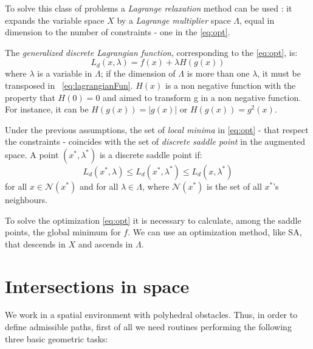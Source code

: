 \documentclass[dissertation.tex]{subfiles}
\begin{document}
To solve this class
of problems a \emph{Lagrange relaxation} method can be used
\cite{bertsekas}: it expands
the variable space $X$ by a \emph{Lagrange multiplier} space
$\Lambda$, equal in dimension to the number of constraints - one in the
\cref{eq:opt}.

The \emph{generalized discrete Lagrangian
  function}, corresponding to the \cref{eq:opt}, is:
\begin{equation}\label{eq:lagrangianFun}
  L_d(x,\lambda)=f(x)+\lambda H(g(x))
\end{equation}
where $\lambda$ is a variable in $\Lambda$; if the dimension of
$\Lambda$ is more than one $\lambda$, it must be transposed in
~\cref{eq:lagrangianFun}. $H(x)$ is a non negative function
with the property that $H(0)=0$ and aimed to transform g in a non
negative function. For instance, it can be  $H(g(x))=|g(x)|$ or
$H(g(x))=g^2(x)$. 

Under the previous assumptions, the set of \emph{local minima}
in \cref{eq:opt} - that respect the constraints -  coincides
with the set of \emph{discrete saddle point}
in the augmented space. A point $(x^*,\lambda^*)$ is a discrete saddle
point if:
\begin{equation*}
  L_d(x^*,\lambda)\leq L_d(x^*,\lambda^*)\leq L_d(x,\lambda^*)
\end{equation*}
for all $x\in\mathcal{N}(x^*)$ and for all $\lambda\in\Lambda$, where
$\mathcal{N}(x^*)$ is the set of all $x^*$'s neighbours.

To solve the optimization \cref{eq:opt} it is necessary to calculate,
among the saddle points, the global minimum for $f$. We can use an
optimization method, like \ac{SA}, that descends in $X$ and ascends in
$\Lambda$.

\section{Intersections in space}\label{sec:intersections}
We work in a spatial environment with polyhedral obstacles. Thus, in
order to define admissible paths, first of all we need routines
performing the following three basic geometric tasks: 
\end{document}
